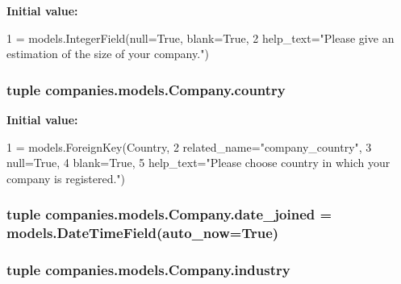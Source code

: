 {\bfseries Initial value\-:}
\begin{DoxyCode}
1 = models.IntegerField(null=\textcolor{keyword}{True}, blank=\textcolor{keyword}{True},
2                                        help\_text=\textcolor{stringliteral}{"Please give an estimation of the size of your company."})
\end{DoxyCode}
\hypertarget{classcompanies_1_1models_1_1_company_a8b69497ee6bf195742df2a0d35dba820}{
\subsubsection[{country}]{\setlength{\rightskip}{0pt plus 5cm}tuple companies.\-models.\-Company.\-country\hspace{0.3cm}{\ttfamily [static]}}}\label{classcompanies_1_1models_1_1_company_a8b69497ee6bf195742df2a0d35dba820}
{\bfseries Initial value\-:}
\begin{DoxyCode}
1 = models.ForeignKey(Country,
2                                 related\_name=\textcolor{stringliteral}{"company\_country"},
3                                 null=\textcolor{keyword}{True},
4                                 blank=\textcolor{keyword}{True},
5                                 help\_text=\textcolor{stringliteral}{"Please choose country in which your company is registered."})
\end{DoxyCode}
\hypertarget{classcompanies_1_1models_1_1_company_ace8092ca613986f78e6a28e26c006e6a}{
\subsubsection[{date\-\_\-joined}]{\setlength{\rightskip}{0pt plus 5cm}tuple companies.\-models.\-Company.\-date\-\_\-joined = models.\-Date\-Time\-Field(auto\-\_\-now=True)\hspace{0.3cm}{\ttfamily [static]}}}\label{classcompanies_1_1models_1_1_company_ace8092ca613986f78e6a28e26c006e6a}
\hypertarget{classcompanies_1_1models_1_1_company_aeeb566248f7aebaa72999f8ebd2ea3c0}{
\subsubsection[{industry}]{\setlength{\rightskip}{0pt plus 5cm}tuple companies.\-models.\-Company.\-industry\hspace{0.3cm}{\ttfamily [static]}}}\label{classcompanies_1_1models_1_1_company_aeeb566248f7aebaa72999f8ebd2ea3c0}
